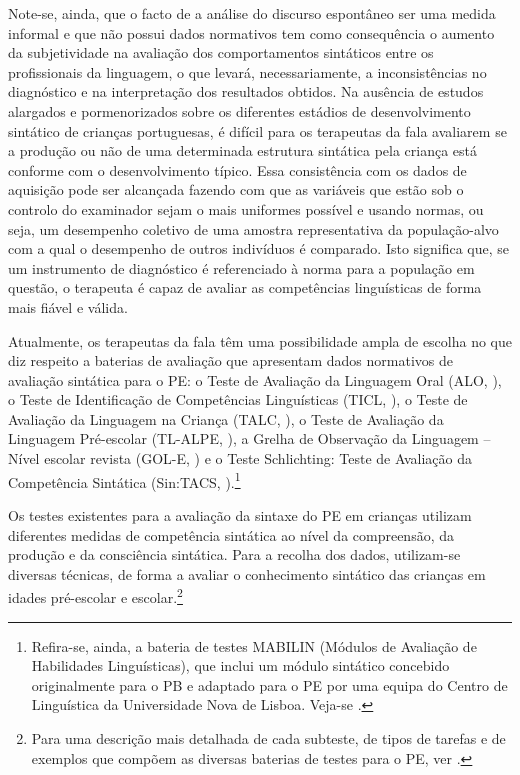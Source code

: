 \documentclass[output=paper,colorlinks,citecolor=brown,booklanguage=portuguese]{langscibook}
\begin{document}
Note-se, ainda, que o facto de a análise do discurso espontâneo ser uma medida informal e que não possui dados normativos tem como consequência o aumento da subjetividade na avaliação dos comportamentos sintáticos entre os profissionais da linguagem, o que levará, necessariamente, a inconsistências no diagnóstico e na interpretação dos resultados obtidos. Na ausência de estudos alargados e pormenorizados sobre os diferentes estádios de desenvolvimento sintático de crianças portuguesas, é difícil para os terapeutas da fala avaliarem se a produção ou não de uma determinada estrutura sintática pela criança está conforme com o desenvolvimento típico. Essa consistência com os dados de aquisição pode ser alcançada fazendo com que as variáveis que estão sob o controlo do examinador sejam o mais uniformes possível e usando normas, ou seja, um desempenho coletivo de uma amostra representativa da população-alvo com a qual o desempenho de outros indivíduos é comparado. Isto significa que, se um instrumento de diagnóstico é referenciado à norma para a população em questão, o terapeuta é capaz de avaliar as competências linguísticas de forma mais fiável e válida. 

\largerpage[-1]
Atualmente, os terapeutas da fala têm uma possibilidade ampla de escolha no que diz respeito a baterias de avaliação que apresentam dados normativos de avaliação sintática para o PE: o Teste de Avaliação da Linguagem Oral (ALO, \citealp{SimSim1997}), o Teste de Identificação de Competências Linguísticas (TICL, \citealp{Viana2004}), o Teste de Avaliação da Linguagem na Criança (TALC, \citealp{SuaKay2006}), o Teste de Avaliação da Linguagem Pré-escolar  (TL-ALPE, \citealp{Mendes2014}), a Grelha de Observação da Linguagem – Nível escolar revista (GOL-E, \citealp{SuaKay2014}) e o Teste Schlichting: Teste de Avaliação da Competência Sintática (Sin:TACS, \citealp{Vieira2018}).\footnote{Refira-se, ainda, a bateria de testes MABILIN (Módulos de Avaliação de Habilidades Linguísticas), que inclui um módulo sintático concebido originalmente para o PB e adaptado para o PE por uma equipa do Centro de Linguística da Universidade Nova de Lisboa. Veja-se .}  

Os testes existentes para a avaliação da sintaxe do PE em crianças utilizam diferentes medidas de competência sintática ao nível da compreensão, da produção e da consciência sintática. Para a recolha dos dados, utilizam-se diversas técnicas, de forma a avaliar o conhecimento sintático das crianças em idades pré-escolar e escolar.\footnote{Para uma descrição mais detalhada de cada subteste, de tipos de tarefas e de exemplos que compõem as diversas baterias de testes para o PE, ver \citet{Martins2017}.}
\end{document}
